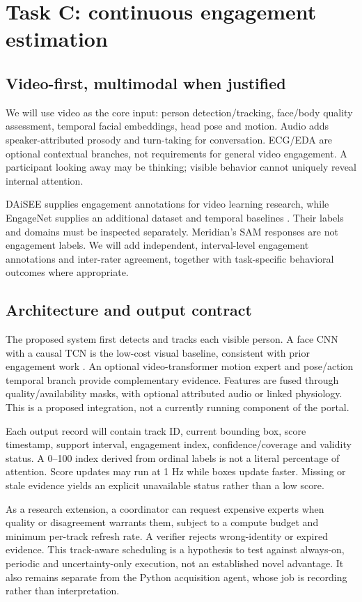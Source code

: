 \documentclass[11pt,a4paper]{article}
\begin{document}
\section{Task C: continuous engagement estimation}
\subsection{Video-first, multimodal when justified}
We will use video as the core input: person detection/tracking, face/body quality assessment, temporal facial embeddings, head pose and motion. Audio adds speaker-attributed prosody and turn-taking for conversation. ECG/EDA are optional contextual branches, not requirements for general video engagement. A participant looking away may be thinking; visible behavior cannot uniquely reveal internal attention.

DAiSEE supplies engagement annotations for video learning research, while EngageNet supplies an additional dataset and temporal baselines \cite{daisee,engagenet}. Their labels and domains must be inspected separately. Meridian's SAM responses are not engagement labels. We will add independent, interval-level engagement annotations and inter-rater agreement, together with task-specific behavioral outcomes where appropriate.

\subsection{Architecture and output contract}
The proposed system first detects and tracks each visible person. A face CNN with a causal TCN is the low-cost visual baseline, consistent with prior engagement work \cite{tcn}. An optional video-transformer motion expert and pose/action temporal branch provide complementary evidence. Features are fused through quality/availability masks, with optional attributed audio or linked physiology. This is a proposed integration, not a currently running component of the portal.

Each output record will contain track ID, current bounding box, score timestamp, support interval, engagement index, confidence/coverage and validity status. A 0--100 index derived from ordinal labels is not a literal percentage of attention. Score updates may run at 1 Hz while boxes update faster. Missing or stale evidence yields an explicit unavailable status rather than a low score.

As a research extension, a coordinator can request expensive experts when quality or disagreement warrants them, subject to a compute budget and minimum per-track refresh rate. A verifier rejects wrong-identity or expired evidence. This track-aware scheduling is a hypothesis to test against always-on, periodic and uncertainty-only execution, not an established novel advantage. It also remains separate from the Python acquisition agent, whose job is recording rather than interpretation.
\end{document}
